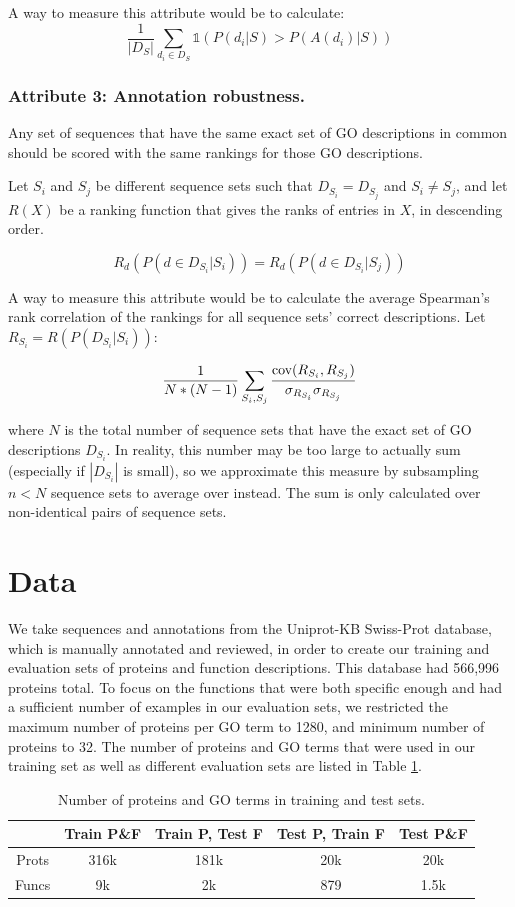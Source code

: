 \documentclass{article}
\begin{document}
        A way to measure this attribute would be to calculate:
        \[\frac{1}{|D_{S}|}\sum_{d_i \in D_{S}} \mathds{1}(P(d_i | S) > P(A(d_i) | S))\]

        \subsubsection{Attribute 3: Annotation robustness.}

        Any set of sequences that have the same exact set of GO descriptions in common should be scored with the same rankings for those GO descriptions.

        Let $S_i$ and $S_j$ be different sequence sets such that $D_{S_i} = D_{S_j}$ and $S_i \neq S_j$, and let $R(X)$ be a ranking function that gives the ranks of entries in $X$, in descending order.

        \[R_{d}(P(d \in D_{S_i} | S_i)) = R_{d}(P(d \in D_{S_i} | S_j))\]

        A way to measure this attribute would be to calculate the average Spearman's rank correlation of the rankings for all sequence sets' correct descriptions.
Let $R_{S_i} = R(P(D_{S_i} | S_i))$:

        \[\frac{1}{N*(N-1)}\sum_{S_i, S_j} \frac{\textnormal{cov}(R_{S_i}, R_{S_j})}{\sigma_{R_{S_i}}\sigma_{R_{S_j}}}\]

        where $N$ is the total number of sequence sets that have the exact set of GO descriptions $D_{S_i}$.
In reality, this number may be too large to actually sum (especially if $|D_{S_i}|$ is small), so we approximate this measure by subsampling $n < N$ sequence sets to average over instead.
The sum is only calculated over non-identical pairs of sequence sets.

\section{Data}
We take sequences and annotations from the Uniprot-KB Swiss-Prot database, which is manually annotated and reviewed, in order to create our training and evaluation sets of proteins and function descriptions. This database had 566,996 proteins total. To focus on the functions that were both specific enough and had a sufficient number of examples in our evaluation sets, we restricted the maximum number of proteins per GO term to 1280, and minimum number of proteins to 32. The number of proteins and GO terms that were used in our training set as well as different evaluation sets are listed in Table \ref{tab:datasets}.
\begin{table}
    \caption{Number of proteins and GO terms in training and test sets.}
	\centering
	\begin{tabular}{c|cccc}
		\toprule
         & Train P\&F & Train P, Test F & Test P, Train F & Test P\&F \\
		\midrule
        Prots & 316k & 181k & 20k & 20k \\
        Funcs & 9k & 2k & 879 & 1.5k \\
		\bottomrule
	\end{tabular}
	\label{tab:datasets}
\end{table}
\end{document}
